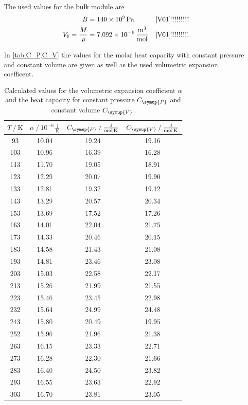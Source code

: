 The used values for the bulk module are 
\begin{align*}
  B &= \qty{140e9}{\pascal} & \text{\cite{V01}!!!!!!!!!!} \\
  V_0 = \frac{M}{\rho} &= \qty{7.092e-6}{\cubic\metre\per\mol} & \text{\cite{V01}!!!!!!!!!}.
\end{align*}

In \autoref{tab:C_P,C_V} the values for the molar heat capacity with constant pressure and constant volume are given as well as the used volumetric expansion
coefficent.

\begin{table}
  \centering
  \caption{Calculated values for the volumetric expansion coefficient $\alpha$ and the heat capacity for constant pressure $C_{\symup{P}}$ and constant %
  volume $C_{\symup{V}}$.}
  \label{tab:C_P,C_V}
  \begin{tabular}{S S S S}
    \toprule
    {$T \mathbin{/} \unit{\kelvin}$} & {$\alpha \mathbin{/} 10^{-6}\,\frac{1}{\unit{\kelvin}}$} & {$C_{\symup{P}} \mathbin{/} \frac{\unit{\joule}}{\unit{\mol\kelvin}}$} & %
    {$C_{\symup{V}} \mathbin{/} \frac{\unit{\joule}}{\unit{\mol\kelvin}}$} \\
    \midrule
    93  & 10.04 & 19.24 & 19.16 \\
    103 & 10.96 & 16.39 & 16.28 \\
    113 & 11.70 & 19.05 & 18.91 \\
    123 & 12.29 & 20.07 & 19.90 \\
    133 & 12.81 & 19.32 & 19.12 \\
    143 & 13.29 & 20.57 & 20.34 \\
    153 & 13.69 & 17.52 & 17.26 \\
    163 & 14.01 & 22.04 & 21.75 \\
    173 & 14.33 & 20.46 & 20.15 \\
    183 & 14.58 & 21.43 & 21.08 \\
    193 & 14.81 & 23.46 & 23.08 \\
    203 & 15.03 & 22.58 & 22.17 \\
    213 & 15.26 & 21.99 & 21.55 \\
    223 & 15.46 & 23.45 & 22.98 \\
    232 & 15.64 & 24.99 & 24.48 \\
    243 & 15.80 & 20.49 & 19.95 \\
    252 & 15.96 & 21.96 & 21.38 \\
    263 & 16.15 & 23.33 & 22.71 \\
    273 & 16.28 & 22.30 & 21.66 \\
    283 & 16.40 & 24.50 & 23.82 \\
    293 & 16.55 & 23.63 & 22.92 \\
    303 & 16.70 & 23.81 & 23.05 \\
    \bottomrule
  \end{tabular}
\end{table}

